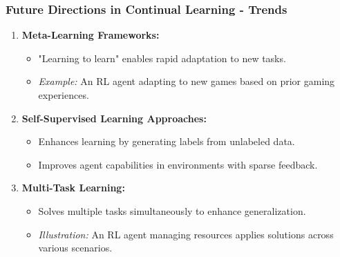 \documentclass[aspectratio=169]{beamer}
\begin{document}
\begin{frame}[fragile]
    \frametitle{Future Directions in Continual Learning - Trends}
    \begin{enumerate}
        \item \textbf{Meta-Learning Frameworks:}
            \begin{itemize}
                \item "Learning to learn" enables rapid adaptation to new tasks.
                \item \textit{Example:} An RL agent adapting to new games based on prior gaming experiences.
            \end{itemize}

        \item \textbf{Self-Supervised Learning Approaches:}
            \begin{itemize}
                \item Enhances learning by generating labels from unlabeled data.
                \item Improves agent capabilities in environments with sparse feedback.
            \end{itemize}

        \item \textbf{Multi-Task Learning:}
            \begin{itemize}
                \item Solves multiple tasks simultaneously to enhance generalization.
                \item \textit{Illustration:} An RL agent managing resources applies solutions across various scenarios.
            \end{itemize}
    \end{enumerate}
\end{frame}
\end{document}
